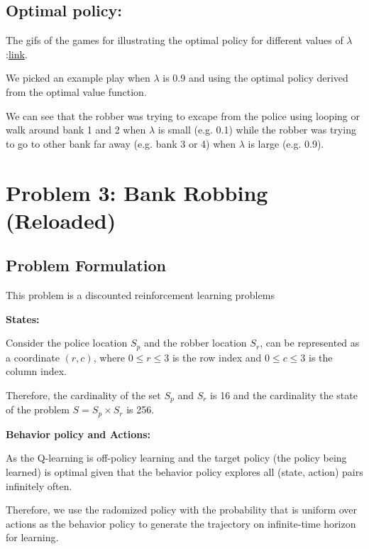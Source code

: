 \documentclass{article}
\begin{document}
\subsection{Optimal policy:}

The gifs of the games for illustrating the optimal policy for different values of $\lambda$
:\href{https://mega.nz/#F!ojJATAAK!KvsQXmRofJkyiYI9tlqWtA}{link}.

We picked an example play when $\lambda$ is 0.9 and using the optimal policy
derived from the optimal value function.


We can see that the robber was trying to excape from the police using
looping or walk around bank 1 and 2 when $\lambda$ is small (e.g. 0.1)
while the robber was trying to go to other bank
far away (e.g. bank 3 or 4) when $\lambda$ is large (e.g. 0.9).

\section{Problem 3: Bank Robbing (Reloaded)}
\subsection{Problem Formulation}

This problem is a discounted reinforcement learning problems

\textbf{States:}

Consider the police location $S_p$ and the robber location $S_r$, can be represented
as a coordinate $(r, c)$, where $0 \leq r \leq 3$ is the row index and $0 \leq c \leq 3$
is the column index.

Therefore, the cardinality of the set $S_p$ and $S_r$ is 16 and
the cardinality the state of the problem $S = S_p \times S_r$ is 256.

\vspace{0.3cm}

\textbf{Behavior policy and Actions:}

As the Q-learning is off-policy learning and the target policy (the policy being
learned) is optimal given that the behavior policy explores all (state, action) pairs
infinitely often.

Therefore, we use the radomized policy with the probability that is uniform
over actions as the behavior policy to generate the trajectory on infinite-time
horizon for learning.
\end{document}
